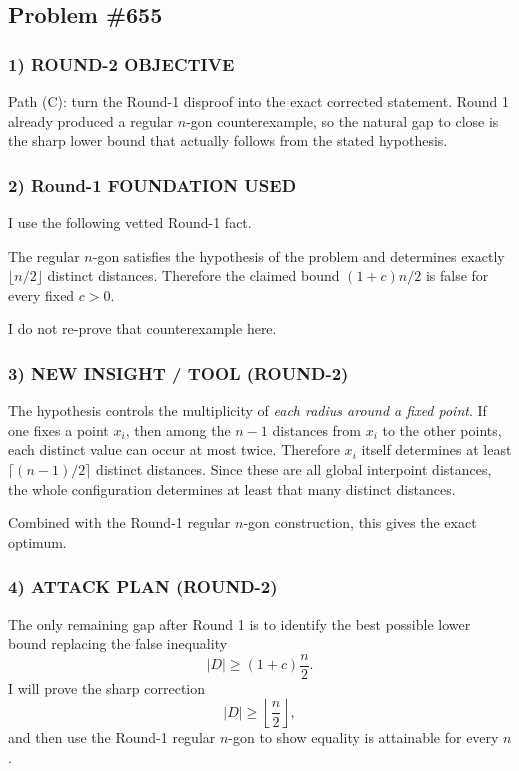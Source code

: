 \subsection*{Problem \#655}

\subsubsection*{1) ROUND-2 OBJECTIVE}
Path (C): turn the Round-1 disproof into the exact corrected statement. Round 1 already produced a regular $n$-gon counterexample, so the natural gap to close is the sharp lower bound that actually follows from the stated hypothesis.

\subsubsection*{2) Round-1 FOUNDATION USED}
I use the following vetted Round-1 fact.

The regular $n$-gon satisfies the hypothesis of the problem and determines exactly $\lfloor n/2\rfloor$ distinct distances. Therefore the claimed bound $(1+c)n/2$ is false for every fixed $c>0$.

I do not re-prove that counterexample here.

\subsubsection*{3) NEW INSIGHT / TOOL (ROUND-2)}
The hypothesis controls the multiplicity of \emph{each radius around a fixed point}. If one fixes a point $x_i$, then among the $n-1$ distances from $x_i$ to the other points, each distinct value can occur at most twice. Therefore $x_i$ itself determines at least $\lceil (n-1)/2\rceil$ distinct distances. Since these are all global interpoint distances, the whole configuration determines at least that many distinct distances.

Combined with the Round-1 regular $n$-gon construction, this gives the exact optimum.

\subsubsection*{4) ATTACK PLAN (ROUND-2)}
The only remaining gap after Round 1 is to identify the best possible lower bound replacing the false inequality
\[
|D|\geq (1+c)\frac n2.
\]
I will prove the sharp correction
\[
|D|\geq \left\lfloor\frac n2\right\rfloor,
\]
and then use the Round-1 regular $n$-gon to show equality is attainable for every $n$.

